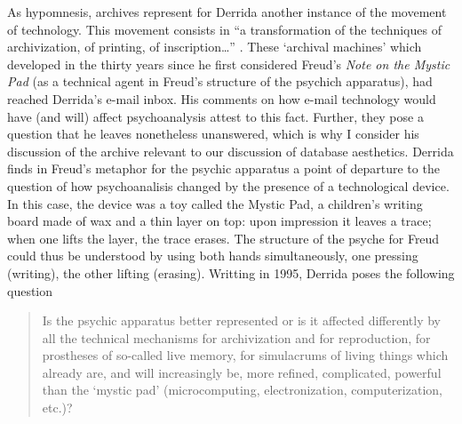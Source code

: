 As hypomnesis, archives represent for Derrida another instance of the movement of technology. This movement consists in ``a transformation of the techniques of archivization, of printing, of inscription\dots'' \parencite[16]{Der95:Arc}. These `archival machines' which developed in the thirty years since he first considered Freud's \textit{Note on the Mystic Pad} (as a technical agent in Freud's structure of the psychich apparatus), had reached Derrida's e-mail inbox. His comments on how e-mail technology would have (and will) affect psychoanalysis attest to this fact. Further, they pose a question that he leaves nonetheless unanswered, which is why I consider his discussion of the archive relevant to our discussion of database aesthetics. Derrida finds in Freud's metaphor for the psychic apparatus a point of departure to the question of how psychoanalisis changed by the presence of a technological device. In this case, the device was a toy called the Mystic Pad, a children's writing board made of wax and a thin layer on top: upon impression it leaves a trace; when one lifts the layer, the trace erases. The structure of the psyche for Freud could thus be understood by using both hands simultaneously, one pressing (writing), the other lifting (erasing). Writting in 1995, Derrida poses the following question

\begin{quote}
	Is the psychic apparatus better represented or is it affected differently by all the technical mechanisms for archivization and for reproduction, for prostheses of so-called live memory, for simulacrums of living things which already are, and will increasingly be, more refined, complicated, powerful than the `mystic pad' (microcomputing, electronization, computerization, etc.)? \parencite[16]{Der95:Arc} 
\end{quote}



